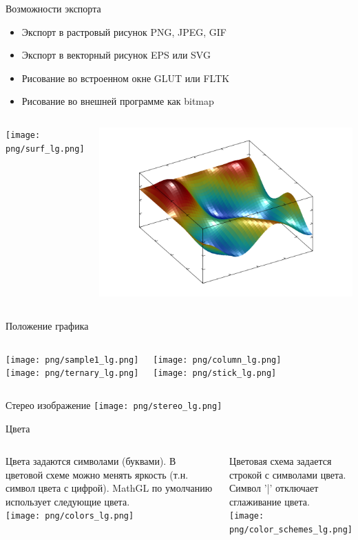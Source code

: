 \documentclass[color=usenames]{beamer}
\begin{document}
\begin{frame}{Возможности экспорта}
\begin{itemize}
\item Экспорт в растровый рисунок PNG, JPEG, GIF
\item Экспорт в векторный рисунок EPS или SVG
\item Рисование во встроенном окне GLUT или FLTK
\item Рисование во внешней программе как bitmap
\end{itemize}
\begin{columns}
\texttt{[image: png/surf\_lg.png]}

\includegraphics[width = \textwidth]{png/surf_eps.png}
\end{columns}
\end{frame}


\begin{frame}{Положение графика}
\begin{columns}
\texttt{[image: png/sample1\_lg.png]}\\
\texttt{[image: png/ternary\_lg.png]}

\texttt{[image: png/column\_lg.png]}\\
\texttt{[image: png/stick\_lg.png]}

\end{columns}
\end{frame}

\begin{frame}{Стерео изображение}
\texttt{[image: png/stereo\_lg.png]}
\end{frame}


\begin{frame}{Цвета}
\begin{columns}
Цвета задаются символами (буквами). В цветовой схеме можно менять яркость (т.н. символ цвета с цифрой). MathGL по умолчанию использует следующие цвета.\\
\texttt{[image: png/colors\_lg.png]}

Цветовая схема задается строкой с символами цвета. Символ '|' отключает сглаживание цвета.\\
\texttt{[image: png/color\_schemes\_lg.png]}
\end{columns}
\end{frame}
\end{document}
